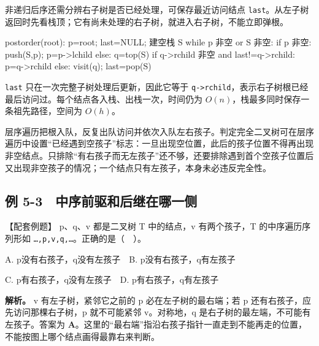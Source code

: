 非递归后序还需分辨右子树是否已经处理，可保存最近访问结点 \texttt{last}。从左子树返回时先看栈顶；它有尚未处理的右子树，就进入右子树，不能立即弹根。

\par\medskip\noindent\begin{minipage}{\linewidth}
\begin{codeblock}[language={}]
postorder(root):
    p=root; last=NULL; 建空栈 S
    while p 非空 or S 非空:
        if p 非空:
            push(S,p); p=p->lchild
        else:
            q=top(S)
            if q->rchild 非空 and last!=q->rchild:
                p=q->rchild
            else:
                visit(q); last=pop(S)
\end{codeblock}
\end{minipage}\par\medskip

\texttt{last} 只在一次完整子树处理后更新，因此它等于 \texttt{q->\allowbreak{}rchild}，表示右子树根已经最后访问过。每个结点各入栈、出栈一次，时间仍为 \(O(n)\)，栈最多同时保存一条祖先路径，空间为 \(O(h)\)。

层序遍历把根入队，反复出队访问并依次入队左右孩子。判定完全二叉树可在层序遍历中设置``已经遇到空孩子''标志：一旦出现空位置，此后的孩子位置不得再出现非空结点。只排除``有右孩子而无左孩子''还不够，还要排除遇到首个空孩子位置后又出现非空孩子的情况；一个结点只有左孩子，本身未必违反完全性。

\subsection{例 5-3　中序前驱和后继在哪一侧}\label{DS05-ex3}

\begin{example}[配套案例]

【配套例题】 p、q、v 都是二叉树 T 中的结点，v 有两个孩子，T 的中序遍历序列形如 \texttt{…,\allowbreak{}p,\allowbreak{}v,\allowbreak{}q,\allowbreak{}…}。正确的是（　）。

A. p没有右孩子，q没有左孩子　B. p没有右孩子，q有左孩子

C. p有右孩子，q没有左孩子　D. p有右孩子，q有左孩子

\end{example}

\textbf{解析。} v 有左子树，紧邻它之前的 p 必在左子树的最右端；若 p 还有右孩子，应先访问那棵右子树，p 就不可能紧邻 v。对称地，q 是右子树的最左端，不可能有左孩子。答案为 \textbf{A}。这里的``最右端''指沿右孩子指针一直走到不能再走的位置，不能按图上哪个结点画得最靠右来判断。

